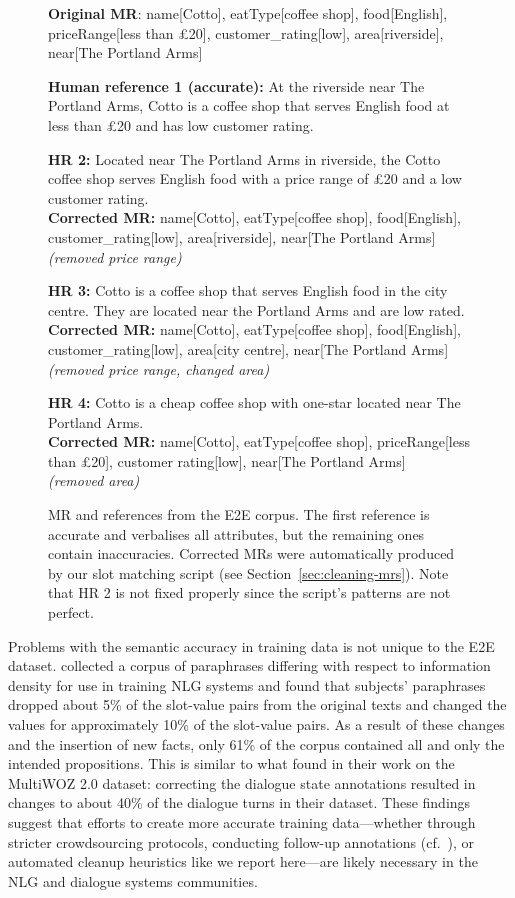 \documentclass[11pt,a4paper]{article}
\begin{document}
\begin{figure}[tb]
\scriptsize\raggedright
\textbf{Original MR}: name[Cotto], eatType[coffee shop], food[English], priceRange[less than £20], customer\_rating[low], area[riverside], near[The Portland Arms]

\medskip
\textbf{Human reference 1 (accurate):} At the riverside near The Portland Arms, Cotto is a coffee shop that serves English food at less than £20 and has low customer rating.

\medskip
\textbf{HR 2:} Located near The Portland Arms in riverside, the Cotto coffee shop serves English food with a price range of £20 and a low customer rating.\\
\textbf{Corrected MR:} name[Cotto], eatType[coffee shop], food[English], customer\_rating[low], area[riverside], near[The Portland Arms] \\\emph{(removed price range)}

\medskip
\textbf{HR 3:} Cotto is a coffee shop that serves English food in the city centre.  They are located near the Portland Arms and are low rated.\\
\textbf{Corrected MR:} name[Cotto], eatType[coffee shop], food[English], customer\_rating[low], area[city centre], near[The Portland Arms] \\\emph{(removed price range, changed area)}

\medskip
\textbf{HR 4:} Cotto is a cheap coffee shop with one-star located near The Portland Arms.\\
\textbf{Corrected MR:} name[Cotto], eatType[coffee shop], priceRange[less than £20], customer rating[low], near[The Portland Arms] \\\emph{(removed area)}
\caption{MR and references from the E2E corpus. The first reference is accurate and verbalises all attributes, but the remaining ones contain inaccuracies. Corrected MRs were automatically produced by our slot matching script (see Section~\ref{sec:cleaning-mrs}). Note that HR 2 is not fixed properly since the script's patterns are not perfect.}
\label{fig:e2e-data}
\end{figure}


Problems with the semantic accuracy in training data is not unique to the E2E dataset.
\citet{howcroft.etal2017:interspeech} collected a corpus of paraphrases differing with respect to information density for use in training NLG systems and found that subjects' paraphrases dropped about 5\% of the slot-value pairs from the original texts and changed the values for approximately 10\% of the slot-value pairs.
As a result of these changes and the insertion of new facts, only 61\% of the corpus contained all and only the intended propositions.
This is similar to what \citet{eric.etal2019} found in their work on the MultiWOZ 2.0 dataset: correcting the dialogue state annotations resulted in changes to about 40\% of the dialogue turns in their dataset.
These findings suggest that efforts to create more accurate training data---whether through stricter crowdsourcing protocols, conducting follow-up annotations (cf.\ \citealp{eric.etal2019}), or automated cleanup heuristics like we report here---are likely necessary in the NLG and dialogue systems communities.
\end{document}

